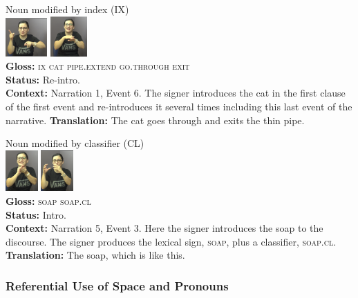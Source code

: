 \documentclass[]{elsarticle} %
\begin{document}
\begin{exe}
\begin{xlist}
\ex \label{ex:2c} Noun modified by index (IX) \\\glll
{} \includegraphics[width=45pt]{pictures/p3.1.png} \includegraphics[width=40pt]{pictures/p3.2.png} {} {} {} \\ \textbf{Gloss:} \textsc{ix} \textsc{cat} \textsc{pipe.extend} \textsc{go.through} \textsc{exit} \\ 
\textbf{Status:} Re-intro. \\
\glt \textbf{Context:} Narration 1, Event 6. The signer introduces the cat in the first clause of the first event and re-introduces it several times including this last event of the narrative.
\glt \textbf{Translation:} The cat goes through and exits the thin pipe.
\vspace{0.35cm}

\ex \label{ex:2d} Noun modified by classifier (CL) \\\glll
{} \includegraphics[width=35pt]{pictures/p4.1.png} \includegraphics[width=35pt]{pictures/p4.2.png} \\ \textbf{Gloss:} \textsc{soap} \textsc{soap.cl} \\ 
\textbf{Status:} Intro. \\
\glt \textbf{Context:} Narration 5, Event 3. Here the signer introduces the soap to the discourse. The signer produces the lexical sign, \textsc{soap}, plus a classifier, \textsc{soap.cl}.
\glt \textbf{Translation:} The soap, which is like this.
\end{xlist}
\end{exe}


\hypertarget{referential-use-of-space-and-pronouns}{%
\subsubsection{Referential Use of Space and
Pronouns}\label{referential-use-of-space-and-pronouns}}
\end{document}
